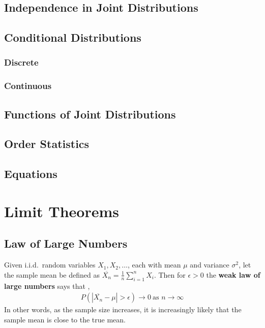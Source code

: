 \documentclass[a4paper,10pt]{article}
\begin{document}
\subsection{Independence in Joint Distributions}

\subsection{Conditional Distributions}
\subsubsection{Discrete}
\subsubsection{Continuous}

\subsection{Functions of Joint Distributions}

\subsection{Order Statistics}

\subsection{Equations}

\section{Limit Theorems}

\subsection{Law of Large Numbers}

Given i.i.d.\ random variables $X_1, X_2, \ldots$, each with mean $\mu$ and variance $\sigma^2$, let the sample mean be defined as $\overline{X_n} = \frac{1}{n}\sum_{i=1}^{n}X_i$. Then for $\epsilon > 0$ the \textbf{weak law of large numbers} says that , 
\begin{align*}
    P(|\overline{X_n} - \mu| > \epsilon) \to 0~\text{as $n \to \infty$}
\end{align*}
In other words, as the sample size increases, it is increasingly likely that the sample mean is close to the true mean. 
\end{document}

